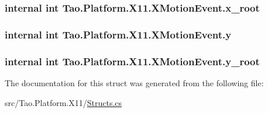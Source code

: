 \hypertarget{struct_tao_1_1_platform_1_1_x11_1_1_x_motion_event_a6c7a0b4a269d5bcf3a2d9c142224e0fc}{
\subsubsection[{x\_\-root}]{\setlength{\rightskip}{0pt plus 5cm}internal int {\bf Tao.Platform.X11.XMotionEvent.x\_\-root}}}
\label{struct_tao_1_1_platform_1_1_x11_1_1_x_motion_event_a6c7a0b4a269d5bcf3a2d9c142224e0fc}
\hypertarget{struct_tao_1_1_platform_1_1_x11_1_1_x_motion_event_a7e21575ec60bc355b9dba0c661ba9106}{
\subsubsection[{y}]{\setlength{\rightskip}{0pt plus 5cm}internal int {\bf Tao.Platform.X11.XMotionEvent.y}}}
\label{struct_tao_1_1_platform_1_1_x11_1_1_x_motion_event_a7e21575ec60bc355b9dba0c661ba9106}
\hypertarget{struct_tao_1_1_platform_1_1_x11_1_1_x_motion_event_a65c2245f4466b6bc4758568792d9f652}{
\subsubsection[{y\_\-root}]{\setlength{\rightskip}{0pt plus 5cm}internal int {\bf Tao.Platform.X11.XMotionEvent.y\_\-root}}}
\label{struct_tao_1_1_platform_1_1_x11_1_1_x_motion_event_a65c2245f4466b6bc4758568792d9f652}


The documentation for this struct was generated from the following file:\begin{DoxyCompactItemize}
\item 
src/Tao.Platform.X11/\hyperlink{_structs_8cs}{Structs.cs}\end{DoxyCompactItemize}
